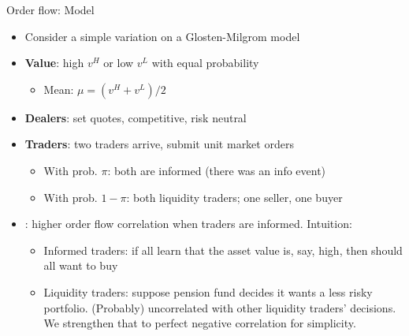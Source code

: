 \documentclass[english,10pt
,aspectratio=169
]{beamer}
\begin{document}
\begin{frame}{Order flow: Model}
	\begin{itemize}
		\item Consider a simple variation on a Glosten-Milgrom model
		\item \textbf{Value}: high $v^H$ or low $v^L$ with equal probability
		\begin{itemize}
			\item Mean: $\mu=(v^H+v^L)/2$
		\end{itemize}
		\item \textbf{Dealers}: set quotes, competitive, risk neutral
		\item \textbf{Traders}: two traders arrive, submit unit market orders
		\begin{itemize}
			\item With prob. $\pi$: both are informed (there was an info event)
			\item With prob. $1-\pi$: both liquidity traders;  one seller, one buyer
		\end{itemize}
		\item {}: higher order flow correlation  when traders are informed. Intuition: 
		\begin{itemize}
			\item Informed traders: if all learn that the asset value is, say, high, then should all want to buy
			\item Liquidity traders: suppose pension fund decides it wants a less risky portfolio. (Probably) uncorrelated with other liquidity traders' decisions. We strengthen that to perfect negative correlation for simplicity.
		\end{itemize}
	\end{itemize}
\end{frame}
\end{document}
